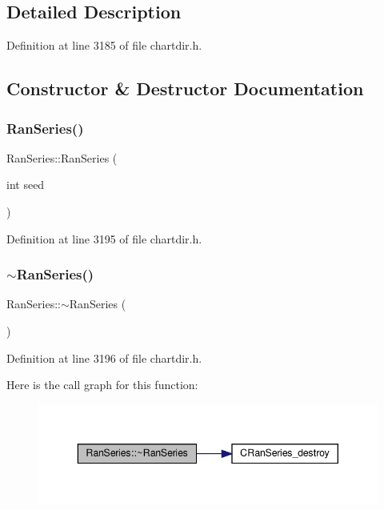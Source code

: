 \subsection{Detailed Description}


Definition at line 3185 of file chartdir.\+h.



\subsection{Constructor \& Destructor Documentation}
\mbox{\label{class_ran_series_a1fece73522edbaa98df15e97c88f249d}} 
\subsubsection{\texorpdfstring{Ran\+Series()}{RanSeries()}}
{\footnotesize\ttfamily Ran\+Series\+::\+Ran\+Series (\begin{DoxyParamCaption}\item[{int}]{seed }\end{DoxyParamCaption})\hspace{0.3cm}{\ttfamily [inline]}}



Definition at line 3195 of file chartdir.\+h.

\mbox{\label{class_ran_series_a8c16907ca0d44d9a08d9bc58ec50faf6}} 
\subsubsection{\texorpdfstring{$\sim$\+Ran\+Series()}{~RanSeries()}}
{\footnotesize\ttfamily Ran\+Series\+::$\sim$\+Ran\+Series (\begin{DoxyParamCaption}{ }\end{DoxyParamCaption})\hspace{0.3cm}{\ttfamily [inline]}}



Definition at line 3196 of file chartdir.\+h.

Here is the call graph for this function\+:
\nopagebreak
\begin{figure}[H]
\begin{center}
\leavevmode
\includegraphics[width=343pt]{class_ran_series_a8c16907ca0d44d9a08d9bc58ec50faf6_cgraph}
\end{center}
\end{figure}


